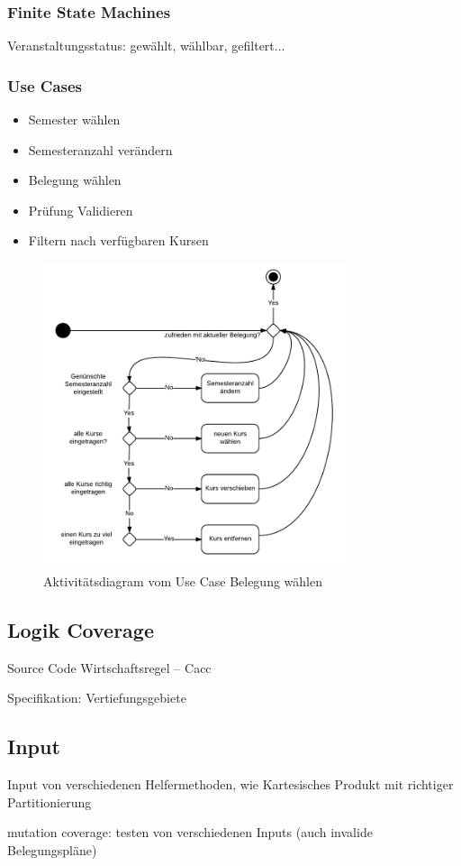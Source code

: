 \documentclass[ngerman]{article}
\begin{document}
\subsubsection{Finite State Machines}
Veranstaltungsstatus: gewählt, wählbar, gefiltert...


\subsubsection{Use Cases}

\begin{itemize}
    \item Semester wählen
    \item Semesteranzahl verändern
    \item Belegung wählen
    \item Prüfung Validieren
    \item Filtern nach verfügbaren Kursen
\end{itemize}

\begin{figure}

\includegraphics[width=0.8\textwidth]{figures/180_Belegungaendern_aktivitaet.pdf}
\caption{Aktivitätsdiagram vom Use Case Belegung wählen}
\end{figure}

\subsection{Logik Coverage}
Source Code
Wirtschaftsregel -- Cacc

Specifikation: Vertiefungsgebiete


\subsection{Input}
Input von verschiedenen Helfermethoden, wie Kartesisches Produkt mit richtiger Partitionierung

mutation coverage: testen von verschiedenen Inputs (auch invalide Belegungspläne)
\end{document}

